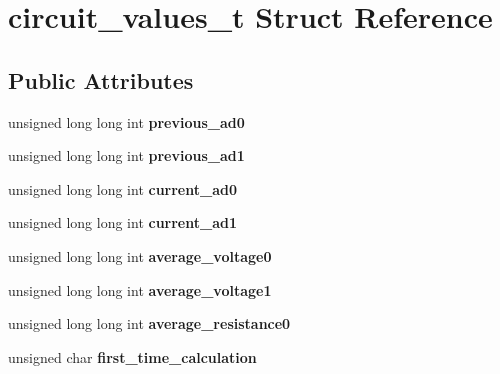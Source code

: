 \hypertarget{structcircuit__values__t}{\section{circuit\+\_\+values\+\_\+t Struct Reference}
\label{structcircuit__values__t}
}
\subsection*{Public Attributes}
\begin{DoxyCompactItemize}
\item 
\hypertarget{structcircuit__values__t_a9a841b3ba337f9e81ede11c8a56a9dc7}{unsigned long long int {\bfseries previous\+\_\+ad0}}\label{structcircuit__values__t_a9a841b3ba337f9e81ede11c8a56a9dc7}

\item 
\hypertarget{structcircuit__values__t_a591bd7a2dd644405bc649c10588809eb}{unsigned long long int {\bfseries previous\+\_\+ad1}}\label{structcircuit__values__t_a591bd7a2dd644405bc649c10588809eb}

\item 
\hypertarget{structcircuit__values__t_a3be5b656f42c4d4bf22ab9cc67a35a1c}{unsigned long long int {\bfseries current\+\_\+ad0}}\label{structcircuit__values__t_a3be5b656f42c4d4bf22ab9cc67a35a1c}

\item 
\hypertarget{structcircuit__values__t_ab666c5c741c84986ade836390be89fb9}{unsigned long long int {\bfseries current\+\_\+ad1}}\label{structcircuit__values__t_ab666c5c741c84986ade836390be89fb9}

\item 
\hypertarget{structcircuit__values__t_a894ea22fc31fe7920925f6ca67c592e8}{unsigned long long int {\bfseries average\+\_\+voltage0}}\label{structcircuit__values__t_a894ea22fc31fe7920925f6ca67c592e8}

\item 
\hypertarget{structcircuit__values__t_a0fc830aba52515020e20db6d4246f740}{unsigned long long int {\bfseries average\+\_\+voltage1}}\label{structcircuit__values__t_a0fc830aba52515020e20db6d4246f740}

\item 
\hypertarget{structcircuit__values__t_a326b45afbccc145e954be9c36bba97d8}{unsigned long long int {\bfseries average\+\_\+resistance0}}\label{structcircuit__values__t_a326b45afbccc145e954be9c36bba97d8}

\item 
\hypertarget{structcircuit__values__t_ae0f8fb3f28d461d66cae124e44c2e1d2}{unsigned char {\bfseries first\+\_\+time\+\_\+calculation}}\label{structcircuit__values__t_ae0f8fb3f28d461d66cae124e44c2e1d2}


\end{DoxyCompactItemize}
